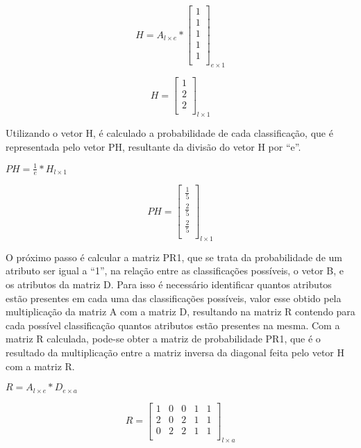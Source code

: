 \begin{anexosenv}
$$H=A_{l \times e} * \left[
\begin{array}{c}
1 \\
1 \\
1 \\
1 \\
1 \\
\end{array}
\right]_{e \times 1}$$

$$H=\left[
\begin{array}{c}
1 \\
2 \\
2 \\
\end{array}
\right]_{l \times 1}$$

Utilizando o vetor H, é calculado a probabilidade de cada classificação, que é representada
pelo vetor PH, resultante da divisão do vetor H por ``e''.

\begin{center}
$PH= \frac{1}{e} * H_{l \times 1}$
\end{center}

$$PH=\left[
\begin{array}{c}
\frac{1}{5} \\
\frac{2}{5} \\
\frac{2}{5} \\
\end{array}
\right]_{l \times 1}$$

O próximo passo é calcular a matriz PR1, que se trata da probabilidade de um
atributo ser igual a ``1'', na relação entre as classificações possíveis, o vetor B, e os
atributos da matriz D. Para isso é necessário identificar quantos atributos
estão presentes em cada uma das classificações possíveis, valor esse  obtido pela multiplicação da matriz A
com a matriz D, resultando na matriz R contendo para cada possível classificação
quantos atributos estão presentes na mesma. Com a matriz R calculada, pode-se
obter a matriz de probabilidade PR1, que é o resultado da multiplicação entre a
matriz inversa da diagonal feita pelo vetor H com a matriz R.

\begin{center}
$R = A_{l \times e} * D_{e \times a}$
\end{center}

$$R=\left[
\begin{array}{ccccc}
1 & 0 & 0 & 1 & 1 \\
2 & 0 & 2 & 1 & 1 \\
0 & 2 & 2 & 1 & 1 \\
\end{array}
\right]_{l \times a}$$


\end{anexosenv}
